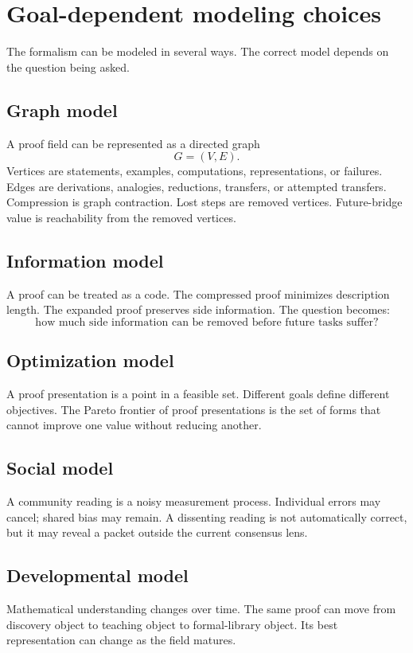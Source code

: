 \documentclass[11pt,oneside]{book}
\theoremstyle{remark}
\begin{document}
\section{Goal-dependent modeling choices}

The formalism can be modeled in several ways.  The correct model depends on the question being asked.

\subsection{Graph model}
A proof field can be represented as a directed graph
\[
        G=(V,E).
\]
Vertices are statements, examples, computations, representations, or failures.  Edges are derivations, analogies, reductions, transfers, or attempted transfers.  Compression is graph contraction.  Lost steps are removed vertices.  Future-bridge value is reachability from the removed vertices.

\subsection{Information model}
A proof can be treated as a code.  The compressed proof minimizes description length.  The expanded proof preserves side information.  The question becomes:
\[
        \text{how much side information can be removed before future tasks suffer?}
\]

\subsection{Optimization model}
A proof presentation is a point in a feasible set.  Different goals define different objectives.  The Pareto frontier of proof presentations is the set of forms that cannot improve one value without reducing another.

\subsection{Social model}
A community reading is a noisy measurement process.  Individual errors may cancel; shared bias may remain.  A dissenting reading is not automatically correct, but it may reveal a packet outside the current consensus lens.

\subsection{Developmental model}
Mathematical understanding changes over time.  The same proof can move from discovery object to teaching object to formal-library object.  Its best representation can change as the field matures.
\end{document}
